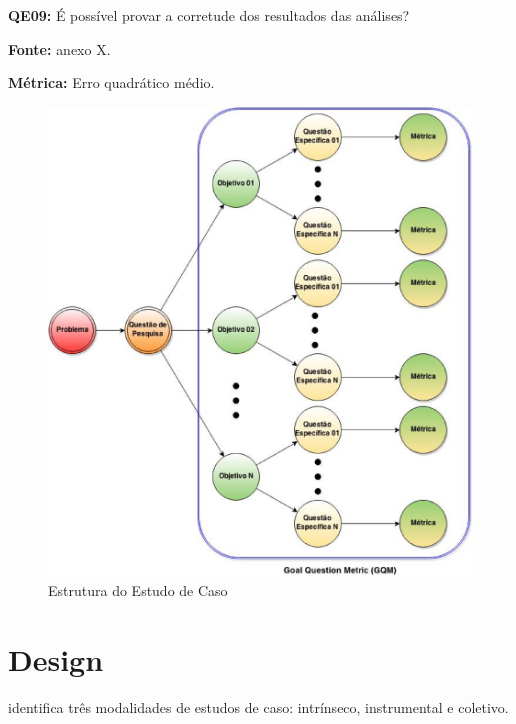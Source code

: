 
\textbf{QE09: } É possível provar a corretude dos resultados das análises? 

\textbf{Fonte:} {\color{red}anexo X}.

\textbf{Métrica:} Erro quadrático médio.\\

	
\begin{figure}[h!]
\centering
\includegraphics[keepaspectratio=false,scale=0.5]{figuras/figuras_nilton/EstruturaEstudoCaso.eps}
\caption{Estrutura do Estudo de Caso}
\label{EstruturaEstudoCaso}
\end{figure}


\section{Design}
\label{sec:design} 

 identifica três modalidades de estudos de caso: intrínseco, instrumental e coletivo. 

